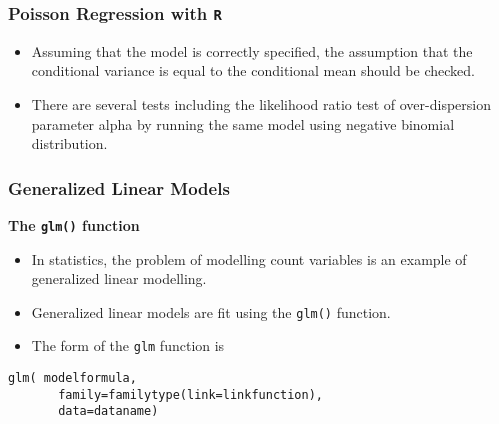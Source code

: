 \documentclass[MASTER.tex]{subfiles}
\begin{document}
\begin{frame}[fragile]
	\frametitle{Poisson Regression with \texttt{R}}
	\Large
	\begin{itemize}
		\item Assuming that the model is correctly specified, the assumption that the conditional variance is equal 
		to the conditional mean should be checked. 
		\item There are several tests including the likelihood ratio test of over-dispersion parameter alpha by running the 
		same model using negative binomial distribution. 
	\end{itemize}
\end{frame}
\begin{frame}[fragile]
\frametitle{Generalized Linear Models}\large
\textbf{The \texttt{glm()} function}
\begin{itemize}
\item In statistics, the problem of modelling count variables is an example of generalized linear modelling.
\item Generalized linear models are fit using the \texttt{glm()} function. 
\item The form of the \texttt{glm} function is
\end{itemize}
{
\normalsize
\begin{framed}
 \begin{verbatim}
glm( modelformula, 
       family=familytype(link=linkfunction),
       data=dataname)
\end{verbatim}
\end{framed}
}
\end{frame}
\end{document}
